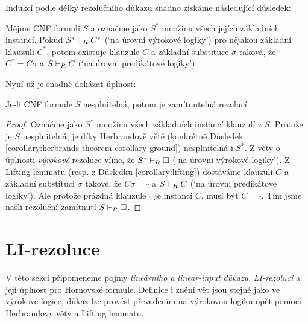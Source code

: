 Indukcí podle délky rezolučního důkazu snadno získáme následující důsledek:

\begin{corollary}\label{corollary:lifting}
Mějme CNF formuli $S$ a označme jako $S^*$ množinu všech jejích základních instancí. Pokud $S^*\vdash_R C^*$ (`na úrovni výrokové logiky') pro nějakou základní klauzuli $C^*$, potom existuje klauzule $C$ a základní substituce $\sigma$ taková, že $C^*=C\sigma$ a $S\vdash_R C$ (`na úrovni predikátové logiky').
\end{corollary}

Nyní už je snadné dokázat úplnost:

\begin{theorem}\label{theorem:completeness-of-predicate-resolution}
    Je-li CNF formule $S$ nesplnitelná, potom je zamítnutelná rezolucí.
\end{theorem}
\begin{proof}
Označme jako $S^*$ množinu všech základních instancí klauzulí z $S$. Protože je $S$ nesplnitelná, je díky Herbrandově větě (konkrétně Důsledek \ref{corollary:herbrands-theorem-corollary-ground}) nesplnitelná i $S^*$. Z věty o úplnosti \emph{výrokové} rezoluce víme, že $S^*\vdash_R\square$ (`na úrovni výrokové logiky'). Z Lifting lemmatu (resp. z Důsledku \ref{corollary:lifting}) dostáváme klauzuli $C$ a základní substituci $\sigma$ takové, že $C\sigma=\square$ a $S\vdash_R C$ (`na úrovni predikátové logiky'). Ale protože prázdná klauzule $\square$ je instancí $C$, musí být $C=\square$. Tím jsme našli rezoluční zamítnutí $S\vdash_R \square$.
\end{proof}


\section{LI-rezoluce}\label{section:predicate-LI-resolution}

V této sekci připomeneme pojmy \emph{lineárního a linear-input důkazu}, \emph{LI-rezoluci} a její úplnost pro Hornovské formule. Definice i znění vět jsou stejné jako ve výrokové logice, důkaz lze provést převedením na výrokovou logiku opět pomocí Herbrandovy věty a Lifting lemmatu.

